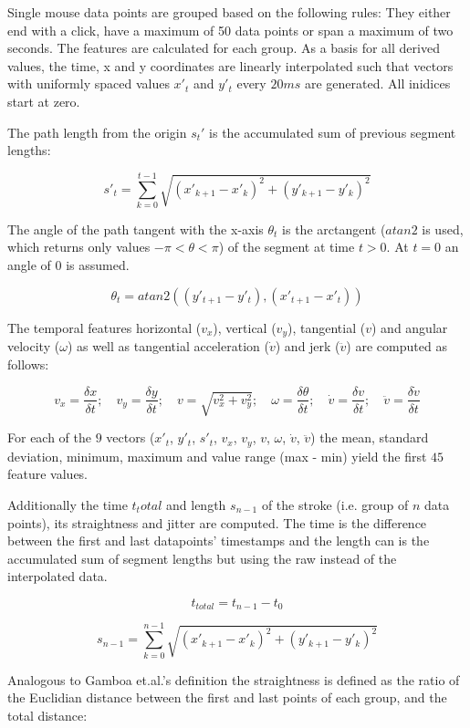 \documentclass[
    fontsize=12pt,
    headings=small,
    parskip=half,           %
    bibliography=totoc,
    numbers=noenddot,       %
    open=any,               %
    final,                   %
    table
]{scrreprt}
\begin{document}
Single mouse data points are grouped based on the following rules: They either end with a click, have a maximum of 50 data points or span a maximum of two seconds. The features are calculated for each group. As a basis for all derived values, the time, x and y coordinates are linearly interpolated such that vectors with uniformly spaced values $x'_t$ and $y'_t$ every $20ms$ are generated. All inidices start at zero.

The path length from the origin $s_t'$ is the accumulated sum of previous segment lengths:

\[
s'_t = \sum_{k = 0}^{t - 1} \sqrt{(x'_{k+1} - x'_{k})^2 + (y'_{k+1} - y'_{k})^2}
\]

The angle of the path tangent with the x-axis $\theta_t$ is the arctangent ($atan2$ is used, which returns only values $-\pi < \theta < \pi$) of the segment at time $t > 0$. At $t=0$ an angle of $0$ is assumed.

\[
\theta_t = atan2( (y'_{t+1} - y'_{t}), (x'_{t+1} - x'_{t}) )
\]

The temporal features horizontal ($v_x$), vertical ($v_y$), tangential ($v$) and angular velocity ($\omega$) as well as tangential acceleration ($\dot{v}$) and jerk ($\ddot{v}$) are computed as follows:

\[
v_x = \frac{\delta x}{\delta t}; \quad
v_y = \frac{\delta y}{\delta t}; \quad
v = \sqrt{v_x^2 + v_y^2}; \quad
\omega = \frac{\delta \theta}{\delta t}; \quad
\dot{v} = \frac{\delta v}{\delta t}; \quad
\ddot{v} = \frac{\delta \dot{v}}{\delta t}
\]

For each of the $9$ vectors ($x'_t$, $y'_t$, $s'_t$, $v_x$, $v_y$, $v$, $\omega$, $\dot{v}$, $\ddot{v}$) the mean, standard deviation, minimum, maximum and value range (max - min) yield the first $45$ feature values.

Additionally the time $t_total$ and length $s_{n-1}$ of the stroke (i.e. group of $n$ data points), its straightness and jitter are computed. The time is the difference between the first and last datapoints' timestamps and the length can is the accumulated sum of segment lengths but using the raw instead of the interpolated data.

\[
t_{total} = t_{n-1} - t_0
\]

\[
s_{n-1} = \sum_{k = 0}^{n - 1} \sqrt{(x'_{k+1} - x'_{k})^2 + (y'_{k+1} - y'_{k})^2}
\]

Analogous to Gamboa et.al.'s definition\cite{GAMBOA2004} the straightness is defined as the ratio of the Euclidian distance between the first and last points of each group, and the total distance:
\end{document}
